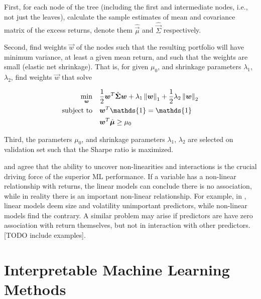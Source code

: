 		First, for each node of the tree (including the first and intermediate nodes, i.e., not just the leaves), calculate the sample estimates of mean and covariance matrix of the excess returns, denote them $\hat{\vec{\mu}}$ and $\hat{\vec{\Sigma}}$ respectively.
		
		Second, find weights $\vec{w}$ of the nodes such that the resulting portfolio will have minimum variance, at least a given mean return, and such that the weights are small (elastic net shrinkage). That is, for given $\mu_0$, and shrinkage parameters $\lambda_1$, $\lambda_2$, find weights $\vec{w}$ that solve 
		
		\begin{equation}
		\begin{aligned}
		\min_{\vec{w}} \quad 
		& \frac{1}{2}\vec{w}^{T} \hat{\vec{\Sigma}} \vec{w} + \lambda_1 \norm{\vec{w}}_1 +  			\frac{1}{2} \lambda_2 \norm{\vec{w}}_2 \\
		\textrm{subject to} \quad 
		& \vec{w}^{T} \mathds{1} = \mathds{1} \\
		& \vec{w}^{T}\hat{\vec{\mu}} \geq \mu_0   \\
		\end{aligned}
		\end{equation}
		
		Third, the parameters $\mu_0$, and shrinkage parameters $\lambda_1$, $\lambda_2$ are selected on validation set such that the Sharpe ratio is maximized. 		
				
		\cite{bryzgalova2019forest} and \cite{gu2020empirical} agree that the ability to uncover non-linearities and interactions is the crucial driving force of the superior ML performance.  If a variable has a non-linear relationship with returns, the linear models can conclude there is no association, while in reality there is an important non-linear relationship. For example, in \cite{gu2020empirical}, linear models deem size and volatility unimportant predictors, while non-linear models find the contrary. A similar problem may arise if predictors are have zero association with return themselves, but not in interaction with other predictors. [TODO include examples]. 
	
	
	\section{Interpretable Machine Learning Methods}
	
